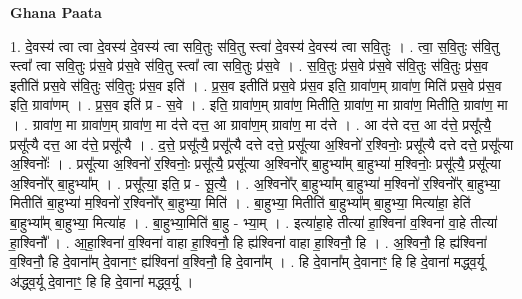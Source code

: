 \documentclass[17pt]{extarticle}
\begin{document}
\textbf{Ghana Paata } \newline

1. दे॒वस्य॑ त्वा त्वा दे॒वस्य॑ दे॒वस्य॑ त्वा सवि॒तुः स॑वि॒तु स्त्वा॑ दे॒वस्य॑ दे॒वस्य॑ त्वा सवि॒तुः । . त्वा॒ स॒वि॒तुः स॑वि॒तु स्त्वा᳚ त्वा सवि॒तुः प्र॑स॒वे प्र॑स॒वे स॑वि॒तु स्त्वा᳚ त्वा सवि॒तुः प्र॑स॒वे । . स॒वि॒तुः प्र॑स॒वे प्र॑स॒वे स॑वि॒तुः स॑वि॒तुः प्र॑स॒व इतीति॑ प्रस॒वे स॑वि॒तुः स॑वि॒तुः प्र॑स॒व इति॑ । . प्र॒स॒व इतीति॑ प्रस॒वे प्र॑स॒व इति॒ ग्रावा॑ण॒म् ग्रावा॑ण॒ मिति॑ प्रस॒वे प्र॑स॒व इति॒ ग्रावा॑णम् । . प्र॒स॒व इति॑ प्र - स॒वे । . इति॒ ग्रावा॑ण॒म् ग्रावा॑ण॒ मितीति॒ ग्रावा॑ण॒ मा ग्रावा॑ण॒ मितीति॒ ग्रावा॑ण॒ मा । . ग्रावा॑ण॒ मा ग्रावा॑ण॒म् ग्रावा॑ण॒ मा द॑त्ते दत्त॒ आ ग्रावा॑ण॒म् ग्रावा॑ण॒ मा द॑त्ते । . आ द॑त्ते दत्त॒ आ द॑त्ते॒ प्रसू᳚त्यै॒ प्रसू᳚त्यै दत्त॒ आ द॑त्ते॒ प्रसू᳚त्यै । . द॒त्ते॒ प्रसू᳚त्यै॒ प्रसू᳚त्यै दत्ते दत्ते॒ प्रसू᳚त्या अ॒श्विनो॑ र॒श्विनोः॒ प्रसू᳚त्यै दत्ते दत्ते॒ प्रसू᳚त्या अ॒श्विनोः᳚ । . प्रसू᳚त्या अ॒श्विनो॑ र॒श्विनोः॒ प्रसू᳚त्यै॒ प्रसू᳚त्या अ॒श्विनो᳚र् बा॒हुभ्या᳚म् बा॒हुभ्या॑ म॒श्विनोः॒ प्रसू᳚त्यै॒ प्रसू᳚त्या अ॒श्विनो᳚र् बा॒हुभ्या᳚म् । . प्रसू᳚त्या॒ इति॒ प्र - सू॒त्यै॒ । . अ॒श्विनो᳚र् बा॒हुभ्या᳚म् बा॒हुभ्या॑ म॒श्विनो॑ र॒श्विनो᳚र् बा॒हुभ्या॒ मितीति॑ बा॒हुभ्या॑ म॒श्विनो॑ र॒श्विनो᳚र् बा॒हुभ्या॒ मिति॑ । . बा॒हुभ्या॒ मितीति॑ बा॒हुभ्या᳚म् बा॒हुभ्या॒ मित्या॑हा॒ हेति॑ बा॒हुभ्या᳚म् बा॒हुभ्या॒ मित्या॑ह । . बा॒हुभ्या॒मिति॑ बा॒हु - भ्या॒म् । . इत्या॑हा॒हे तीत्या॑ हा॒श्विना॑ व॒श्विना॑ वा॒हे तीत्या॑ हा॒श्विनौ᳚ । . आ॒हा॒श्विना॑ व॒श्विना॑ वाहा हा॒श्विनौ॒ हि ह्य॑श्विना॑ वाहा हा॒श्विनौ॒ हि । . अ॒श्विनौ॒ हि ह्य॑श्विना॑ व॒श्विनौ॒ हि दे॒वाना᳚म् दे॒वानाꣳ॒॒ ह्य॑श्विना॑ व॒श्विनौ॒ हि दे॒वाना᳚म् । . हि दे॒वाना᳚म् दे॒वानाꣳ॒॒ हि हि दे॒वाना॑ मद्ध्व॒र्यू अ॑द्ध्व॒र्यू दे॒वानाꣳ॒॒ हि हि दे॒वाना॑ मद्ध्व॒र्यू । \newline
\end{document}
